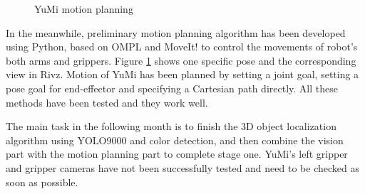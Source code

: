 \begin{figure}[H]
    \centering
    \caption{YuMi motion planning}
    \label{motion}
\end{figure}

In the meanwhile, preliminary motion planning algorithm has been developed using Python, based on OMPL and MoveIt! to control the movements of robot's both arms and grippers. Figure \ref{motion} shows one specific pose and the corresponding view in Rivz. Motion of YuMi has been planned by setting a joint goal, setting a pose goal for end-effector and specifying a Cartesian path directly. All these methods have been tested and they work well.

The main task in the following month is to finish the 3D object localization algorithm using YOLO9000 and color detection, and then combine the vision part with the motion planning part to complete stage one. YuMi's left gripper and gripper cameras have not been successfully tested and need to be checked as soon as possible.

